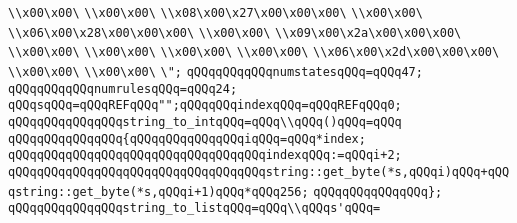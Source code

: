 \verb|\\x00\x00\|\newline
\verb|\\x00\x00\|\newline
\verb|\\x08\x00\x27\x00\x00\x00\|\newline
\verb|\\x00\x00\|\newline
\verb|\\x06\x00\x28\x00\x00\x00\|\newline
\verb|\\x00\x00\|\newline
\verb|\\x09\x00\x2a\x00\x00\x00\|\newline
\verb|\\x00\x00\|\newline
\verb|\\x00\x00\|\newline
\verb|\\x00\x00\|\newline
\verb|\\x00\x00\|\newline
\verb|\\x06\x00\x2d\x00\x00\x00\|\newline
\verb|\\x00\x00\|\newline
\verb|\\x00\x00\|\newline
\verb|\";|\newline
\verb|qQQqqQQqqQQqnumstatesqQQq=qQQq47;|\newline
\verb|qQQqqQQqqQQqnumrulesqQQq=qQQq24;|\newline
\verb|qQQqsqQQq=qQQqREFqQQq"";qQQqqQQqindexqQQq=qQQqREFqQQq0;|\newline
\verb|qQQqqQQqqQQqqQQqstring_to_intqQQq=qQQq\\qQQq()qQQq=qQQq|\newline
\verb|qQQqqQQqqQQqqQQq{qQQqqQQqqQQqqQQqiqQQq=qQQq*index;|\newline
\verb|qQQqqQQqqQQqqQQqqQQqqQQqqQQqqQQqqQQqindexqQQq:=qQQqi+2;|\newline
\verb|qQQqqQQqqQQqqQQqqQQqqQQqqQQqqQQqqQQqstring::get_byte(*s,qQQqi)qQQq+qQQqstring::get_byte(*s,qQQqi+1)qQQq*qQQq256;|\newline
\verb|qQQqqQQqqQQqqQQq};|\newline
\newline
\verb|qQQqqQQqqQQqqQQqstring_to_listqQQq=qQQq\\qQQqs'qQQq=|\newline

